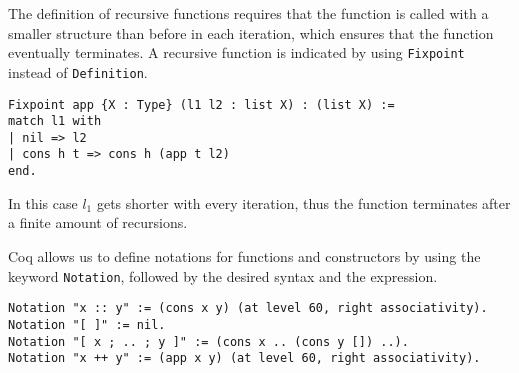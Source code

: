\documentclass{scrreprt}
\begin{document}
The definition of recursive functions requires that the function is called with a smaller structure than before in each iteration, which ensures that the function eventually terminates. A recursive function is indicated by using \texttt{Fixpoint} instead of \texttt{Definition}.
\begin{verbatim}
Fixpoint app {X : Type} (l1 l2 : list X) : (list X) :=
match l1 with
| nil => l2
| cons h t => cons h (app t l2)
end.
\end{verbatim}
In this case $l_{1}$ gets shorter with every iteration, thus the function terminates after a finite amount of recursions. 

Coq allows us to define notations for functions and constructors by using the keyword \texttt{Notation}, followed by the desired syntax and the expression. 
\begin{verbatim}
Notation "x :: y" := (cons x y) (at level 60, right associativity).
Notation "[ ]" := nil.
Notation "[ x ; .. ; y ]" := (cons x .. (cons y []) ..).
Notation "x ++ y" := (app x y) (at level 60, right associativity).
\end{verbatim}
\end{document}

